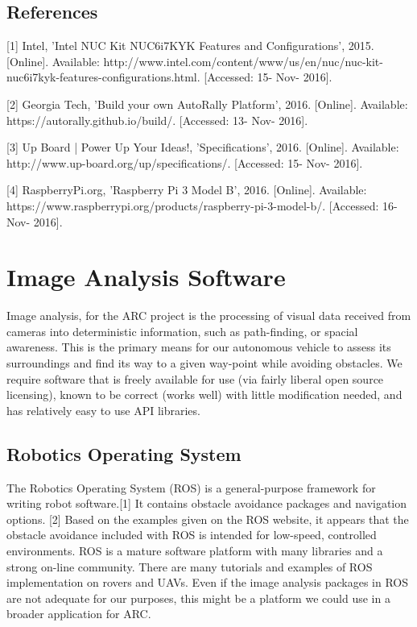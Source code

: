 \documentclass[compsoc,draftclsnofoot,onecolumn,10pt]{IEEEtran}
\begin{document}
\subsection{References}
[1] Intel, 'Intel NUC Kit NUC6i7KYK Features and Configurations',  2015. [Online]. Available: http://www.intel.com/content/www/us/en/nuc/nuc-kit-nuc6i7kyk-features-configurations.html. [Accessed: 15- Nov- 2016].

[2] Georgia Tech, 'Build your own AutoRally Platform',  2016. [Online]. Available: https://autorally.github.io/build/. [Accessed: 13- Nov- 2016].

[3] Up Board | Power Up Your Ideas!, 'Specifications',  2016. [Online]. Available: http://www.up-board.org/up/specifications/. [Accessed: 15- Nov- 2016].

[4] RaspberryPi.org, 'Raspberry Pi 3 Model B',  2016. [Online]. Available: https://www.raspberrypi.org/products/raspberry-pi-3-model-b/. [Accessed: 16- Nov- 2016].


\newpage

\section{Image Analysis Software}
Image analysis, for the ARC project is the processing of visual data received
from cameras into deterministic information, such as path-finding, or spacial
awareness. This is the primary means for our autonomous vehicle to assess its
surroundings and find its way to a given way-point while avoiding obstacles. We
require software that is freely available for use (via fairly liberal open
source licensing), known to be correct (works well) with little modification
needed, and has relatively easy to use API libraries.

\subsection{Robotics Operating System}
The Robotics Operating System (ROS) is a general-purpose framework for writing
robot software.[1] It contains obstacle avoidance packages and navigation
options. [2] Based on the examples given on the ROS website, it appears that the
obstacle avoidance included with ROS is intended for low-speed, controlled
environments. ROS is a mature software platform with many libraries and a strong
on-line community.  There are many tutorials and examples of ROS implementation
on rovers and UAVs.  Even if the image analysis packages in ROS are not adequate
for our purposes, this might be a platform we could use in a broader application
for ARC.
\end{document}
